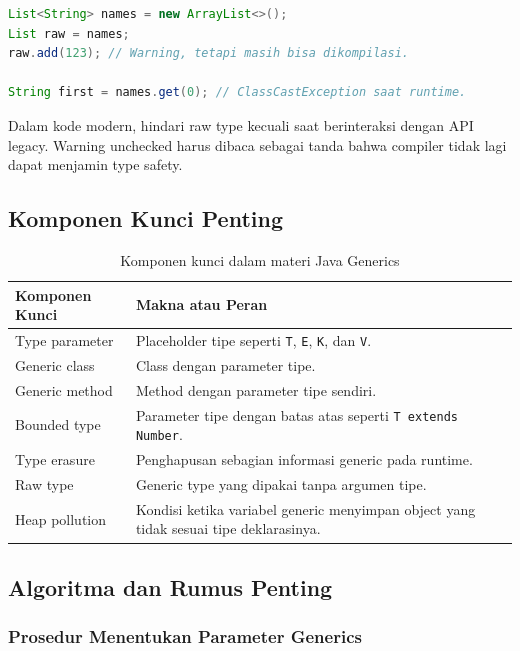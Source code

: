 \begin{lstlisting}[language=Java, caption={Raw type berbahaya}, label={lst:raw-type}]
List<String> names = new ArrayList<>();
List raw = names;
raw.add(123); // Warning, tetapi masih bisa dikompilasi.

String first = names.get(0); // ClassCastException saat runtime.
\end{lstlisting}

Dalam kode modern, hindari raw type kecuali saat berinteraksi dengan API legacy. Warning unchecked harus dibaca sebagai tanda bahwa compiler tidak lagi dapat menjamin type safety.

\subsection{Komponen Kunci Penting}

\begin{table}[H]
\centering
\begin{tabularx}{\textwidth}{|L{0.28\textwidth}|X|}
\hline
\textbf{Komponen Kunci} & \textbf{Makna atau Peran} \\
\hline
Type parameter & Placeholder tipe seperti \texttt{T}, \texttt{E}, \texttt{K}, dan \texttt{V}. \\
\hline
Generic class & Class dengan parameter tipe. \\
\hline
Generic method & Method dengan parameter tipe sendiri. \\
\hline
Bounded type & Parameter tipe dengan batas atas seperti \texttt{T extends Number}. \\
\hline
Type erasure & Penghapusan sebagian informasi generic pada runtime. \\
\hline
Raw type & Generic type yang dipakai tanpa argumen tipe. \\
\hline
Heap pollution & Kondisi ketika variabel generic menyimpan object yang tidak sesuai tipe deklarasinya. \\
\hline
\end{tabularx}
\caption{Komponen kunci dalam materi Java Generics}
\label{tab:komponen-kunci-java-generics}
\end{table}

\subsection{Algoritma dan Rumus Penting}

\subsubsection{Prosedur Menentukan Parameter Generics}

